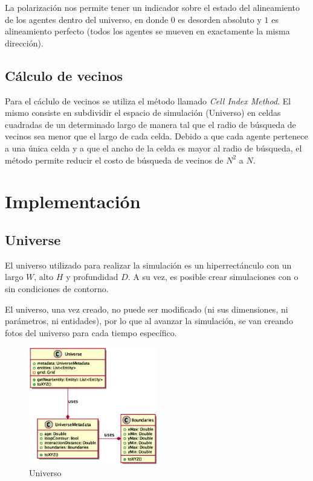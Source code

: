\documentclass[a4paper]{article}
\begin{document}
            La polarización nos permite tener un indicador sobre el estado del alineamiento de los agentes dentro del universo, en donde $0$ es desorden absoluto y $1$ es alineamiento perfecto (todos los agentes se mueven en exactamente la misma dirección).


        \subsection{Cálculo de vecinos}
            Para el cáclulo de vecinos se utiliza el método llamado \textit{Cell Index Method}. El mismo consiste en subdividir el espacio de simulación (Universo) en celdas cuadradas de un determinado largo de manera tal que el radio de búsqueda de vecinos sea menor que el largo de cada celda. Debido a que cada agente pertenece a una única celda y a que el ancho de la celda es mayor al radio de búsqueda, el método permite reducir el costo de búsqueda de vecinos de $N^2$ a $N$.


    \section{Implementación}

        \subsection{Universe}

            El universo utilizado para realizar la simulación es un hiperrectánculo con un largo $W$, alto $H$ y profundidad $D$. A su vez, es posible crear simulaciones con o sin condiciones de contorno.

            El universo, una vez creado, no puede ser modificado (ni sus dimensiones, ni parámetros, ni entidades), por lo que al avanzar la simulación, se van creando fotos del universo para cada tiempo específico.


            \begin{figure}[H]
                \centering
                \includegraphics[width=0.5\textwidth]{../imgs/universe}
                \caption{Universo}
                \label{fig:universe_implementation}
            \end{figure}
\end{document}
